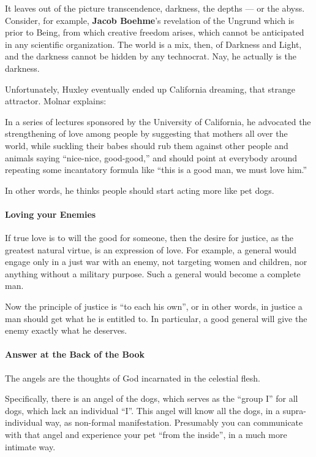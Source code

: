 It leaves out of the picture transcendence, darkness, the depths — or the abyss. Consider, for example, \textbf{Jacob Boehme}'s revelation of the Ungrund which is prior to Being, from which creative freedom arises, which cannot be anticipated in any scientific organization. The world is a mix, then, of Darkness and Light, and the darkness cannot be hidden by any technocrat. Nay, he actually is the darkness.

Unfortunately, Huxley eventually ended up California dreaming, that strange attractor. Molnar explains:

\begin{quotex}
In a series of lectures sponsored by the University of California, he advocated the strengthening of love among people by suggesting that mothers all over the world, while suckling their babes should rub them against other people and animals saying “nice-nice, good-good,” and should point at everybody around repeating some incantatory formula like “this is a good man, we must love him.”

\end{quotex}
In other words, he thinks people should start acting more like pet dogs.

\paragraph{Loving your Enemies}
If true love is to will the good for someone, then the desire for justice, as the greatest natural virtue, is an expression of love. For example, a general would engage only in a just war with an enemy, not targeting women and children, nor anything without a military purpose. Such a general would become a complete man.

Now the principle of justice is “to each his own”, or in other words, in justice a man should get what he is entitled to. In particular, a good general will give the enemy exactly what he deserves.

\paragraph{Answer at the Back of the Book}
\begin{quotex}
The angels are the thoughts of God incarnated in the celestial flesh. 

\end{quotex}
Specifically, there is an angel of the dogs, which serves as the “group I” for all dogs, which lack an individual “I”. This angel will know all the dogs, in a supra-individual way, as non-formal manifestation. Presumably you can communicate with that angel and experience your pet “from the inside”, in a much more intimate way.

